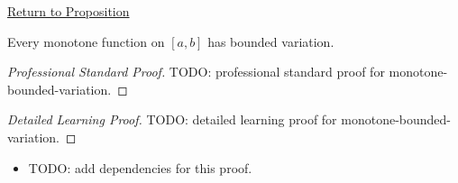 \newpage
{}
\label{prf:monotone-bounded-variation}
\begin{remark*}[Return]\hyperref[prop:monotone-bounded-variation]{Return to Proposition}\end{remark*}

\begin{proposition*}
Every monotone function on \([a,b]\) has bounded variation.
\end{proposition*}

\begin{proof}[Professional Standard Proof]
\LRAProofBodyStart
TODO: professional standard proof for monotone-bounded-variation.
\end{proof}

\begin{proof}[Detailed Learning Proof]
\LRAProofBodyStart
TODO: detailed learning proof for monotone-bounded-variation.
\end{proof}

\begin{remark*}
\end{remark*}

\begin{dependencies}
\begin{itemize}
  \item TODO: add dependencies for this proof.
\end{itemize}
\end{dependencies}

\clearpage
